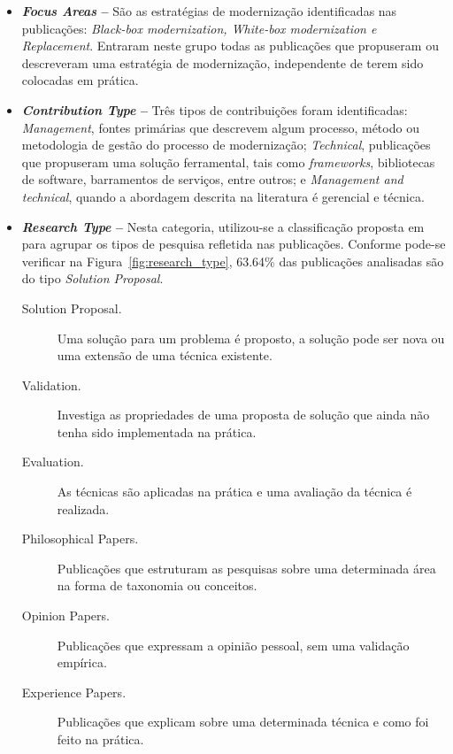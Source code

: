 \begin{itemize}

\item \textbf{\textit{Focus Areas} --} São as estratégias de modernização identificadas nas publicações: \textit{Black-box modernization, White-box modernization e Replacement}. Entraram neste grupo todas as publicações que propuseram ou descreveram uma estratégia de modernização, independente de terem sido colocadas em prática.

\item \textbf{\textit{Contribution Type} --} Três tipos de contribuições foram 
identificadas: \textit{Management}, fontes primárias que descrevem algum processo, método ou metodologia de gestão do processo de modernização; \textit{Technical}, publicações que propuseram uma solução ferramental, tais como \textit{frameworks}, bibliotecas de software, barramentos de serviços, entre outros; e \textit{Management and technical}, quando a abordagem descrita na literatura é gerencial e técnica.

\item \textbf{\textit{Research Type} --} Nesta categoria, utilizou-se a classificação proposta em \cite{wieringa2006requirements} para agrupar os tipos de pesquisa refletida nas publicações. 
Conforme pode-se verificar na Figura~\ref{fig:research_type}, 
63.64\% das publicações analisadas são do tipo \textit{Solution Proposal}.

\begin{description}
\item[Solution Proposal.] Uma solução para um problema é proposto, a solução pode ser nova ou uma extensão de uma técnica existente.
\item[Validation.] Investiga as propriedades de uma proposta de solução que ainda não tenha sido implementada na prática.
\item[Evaluation.] As técnicas são aplicadas na prática e uma avaliação da técnica é realizada.
\item[Philosophical Papers.] Publicações que estruturam as pesquisas sobre uma determinada área na forma de taxonomia ou conceitos.
\item[Opinion Papers.] Publicações que expressam a opinião pessoal, sem uma valida\c c\~{a}o emp\'{i}rica.
\item[Experience Papers.] Publicações que explicam sobre uma determinada técnica e como foi feito na prática.
\end{description}

\end{itemize}


